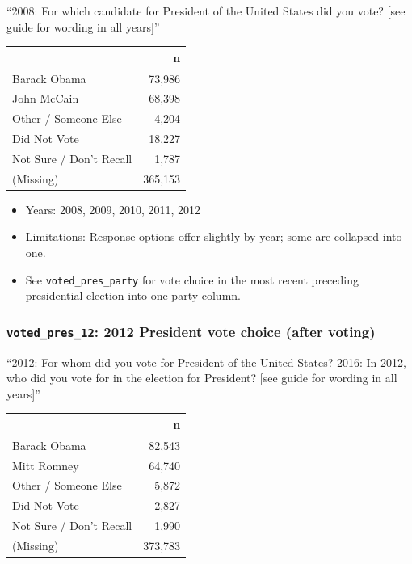 \documentclass[10pt,article,oneside]{memoir}
\theoremstyle{definition}
\begin{document}
``2008: For which candidate for President of the United States did you
vote? {[}see guide for wording in all years{]}''

\begin{table}[H]
\centering
\begin{tabular}{lr}
\toprule
 & n\\
\midrule
Barack Obama & 73,986\\
John McCain & 68,398\\
Other / Someone Else & 4,204\\
Did Not Vote & 18,227\\
Not Sure / Don't Recall & 1,787\\
(Missing) & 365,153\\
\bottomrule
\end{tabular}
\end{table}

\begin{itemize}
\tightlist
\item
  Years: 2008, 2009, 2010, 2011, 2012
\item
  Limitations: Response options offer slightly by year; some are
  collapsed into one.
\item
  See \texttt{voted\_pres\_party} for vote choice in the most recent
  preceding presidential election into one party column.
\end{itemize}

\hypertarget{voted_pres_12-2012-president-vote-choice-after-voting}{%
\subsubsection{\texorpdfstring{\texttt{voted\_pres\_12}: 2012 President
vote choice (after
voting)}{voted\_pres\_12: 2012 President vote choice (after voting)}}\label{voted_pres_12-2012-president-vote-choice-after-voting}}

``2012: For whom did you vote for President of the United States? 2016:
In 2012, who did you vote for in the election for President? {[}see
guide for wording in all years{]}''

\begin{table}[H]
\centering
\begin{tabular}{lr}
\toprule
 & n\\
\midrule
Barack Obama & 82,543\\
Mitt Romney & 64,740\\
Other / Someone Else & 5,872\\
Did Not Vote & 2,827\\
Not Sure / Don't Recall & 1,990\\
(Missing) & 373,783\\
\bottomrule
\end{tabular}
\end{table}
\end{document}
